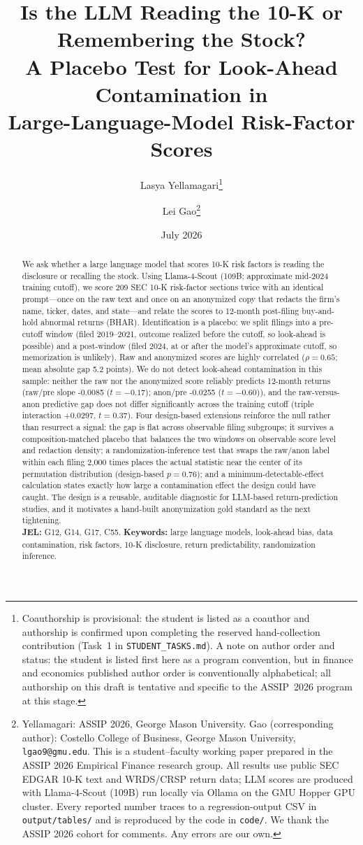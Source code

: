 \documentclass[12pt]{article}
\title{\textbf{Is the LLM Reading the 10-K or Remembering the Stock?\\
A Placebo Test for Look-Ahead Contamination in\\
Large-Language-Model Risk-Factor Scores}}
\author{Lasya Yellamagari\thanks{Coauthorship is provisional: the student is listed as a coauthor and authorship is confirmed upon completing the reserved hand-collection contribution (Task~1 in \texttt{STUDENT\_TASKS.md}). A note on author order and status: the student is listed first here as a program convention, but in finance and economics published author order is conventionally alphabetical; all authorship on this draft is tentative and specific to the ASSIP~2026 program at this stage.} \and Lei Gao\thanks{Yellamagari: ASSIP 2026, George Mason
University. Gao (corresponding author): Costello College of Business, George Mason
University, \texttt{lgao9@gmu.edu}. This is a student--faculty working paper prepared in the
ASSIP 2026 Empirical Finance research group. All results use public SEC EDGAR 10-K text and
WRDS/CRSP return data; LLM scores are produced with Llama-4-Scout (109B) run locally via
Ollama on the GMU Hopper GPU cluster. Every reported number traces to a regression-output CSV
in \texttt{output/tables/} and is reproduced by the code in \texttt{code/}. We thank the ASSIP
2026 cohort for comments. Any errors are our own.}}
\date{July 2026}
\begin{document}
\maketitle

\begin{abstract}
\noindent
We ask whether a large language model that scores 10-K risk factors is reading the disclosure or recalling the stock. Using Llama-4-Scout (109B; approximate mid-2024 training cutoff), we score 209 SEC 10-K risk-factor sections twice with an identical prompt---once on the raw text and once on an anonymized copy that redacts the firm's name, ticker, dates, and state---and relate the scores to 12-month post-filing buy-and-hold abnormal returns (BHAR). Identification is a placebo: we split filings into a pre-cutoff window (filed 2019--2021, outcome realized before the cutoff, so look-ahead is possible) and a post-window (filed 2024, at or after the model's approximate cutoff, so memorization is unlikely). Raw and anonymized scores are highly correlated ($\rho=0.65$; mean absolute gap 5.2 points). We do not detect look-ahead contamination in this sample: neither the raw nor the anonymized score reliably predicts 12-month returns (raw/pre slope -0.0085 ($t=-0.17$); anon/pre -0.0255 ($t=-0.60$)), and the raw-versus-anon predictive gap does not differ significantly across the training cutoff (triple interaction +0.0297, $t=0.37$). Four design-based extensions reinforce the null rather than resurrect a signal: the gap is flat across observable filing subgroups; it survives a composition-matched placebo that balances the two windows on observable score level and redaction density; a randomization-inference test that swaps the raw/anon label within each filing 2{,}000 times places the actual statistic near the center of its permutation distribution (design-based $p=0.76$); and a minimum-detectable-effect calculation states exactly how large a contamination effect the design could have caught. The design is a reusable, auditable diagnostic for LLM-based return-prediction studies, and it motivates a hand-built anonymization gold standard as the next tightening.
\\[4pt]
\noindent\textbf{JEL:} G12, G14, G17, C55. \quad
\textbf{Keywords:} large language models, look-ahead bias, data contamination, risk
factors, 10-K disclosure, return predictability, randomization inference.
\end{abstract}

\newpage
\end{document}
